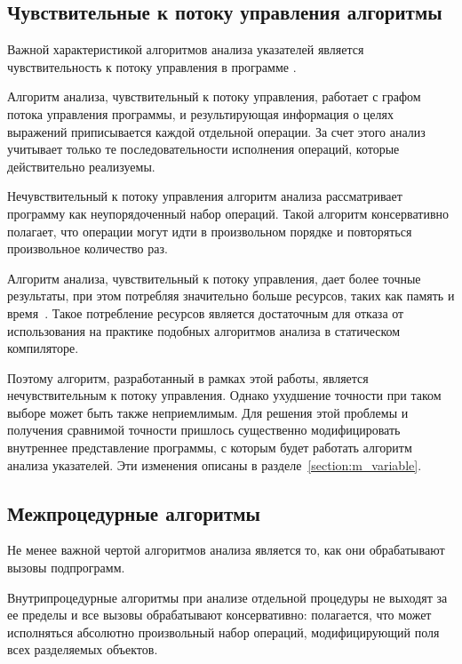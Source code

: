 \documentclass[14pt,titlepage,draft]{extarticle}
\begin{document}
  \subsection{Чувствительные к потоку управления алгоритмы}

    Важной характеристикой алгоритмов анализа указателей является
    чувствительность к потоку управления в программе
    .

    Алгоритм анализа, чувствительный к потоку управления, работает с графом
    потока управления программы, и результирующая информация о целях
    выражений приписывается каждой отдельной операции. За счет этого анализ
    учитывает только те последовательности исполнения операций, которые
    действительно реализуемы.

    Нечувствительный к потоку управления алгоритм анализа рассматривает
    программу как неупорядоченный набор операций. Такой алгоритм
    консервативно полагает, что операции могут идти в произвольном порядке и
    повторяться произвольное количество раз.

    Алгоритм анализа, чувствительный к потоку управления, дает более точные
    результаты, при этом потребляя значительно больше ресурсов, таких как
    память и время~\cite[раздел.~4.4]{hind_pointer_analysis_not_solved_yet}.
    Такое потребление ресурсов является достаточным для отказа от
    использования на практике подобных алгоритмов анализа в статическом
    компиляторе.

    Поэтому алгоритм, разработанный в рамках этой работы, является
    нечувствительным к потоку управления. Однако ухудшение точности при таком
    выборе может быть также неприемлимым.
    Для решения этой проблемы и получения сравнимой точности пришлось
    существенно модифицировать внутреннее представление программы, с которым
    будет работать алгоритм анализа указателей. Эти изменения описаны в
    разделе~\ref{section:m_variable}.

  \subsection{Межпроцедурные алгоритмы}

    Не менее важной чертой алгоритмов анализа является то, как они
    обрабатывают вызовы подпрограмм.

    Внутрипроцедурные алгоритмы при анализе отдельной процедуры не выходят за
    ее пределы и все вызовы обрабатывают консервативно: полагается, что может
    исполняться абсолютно произвольный набор операций, модифицирующий поля
    всех разделяемых объектов.
\end{document}
